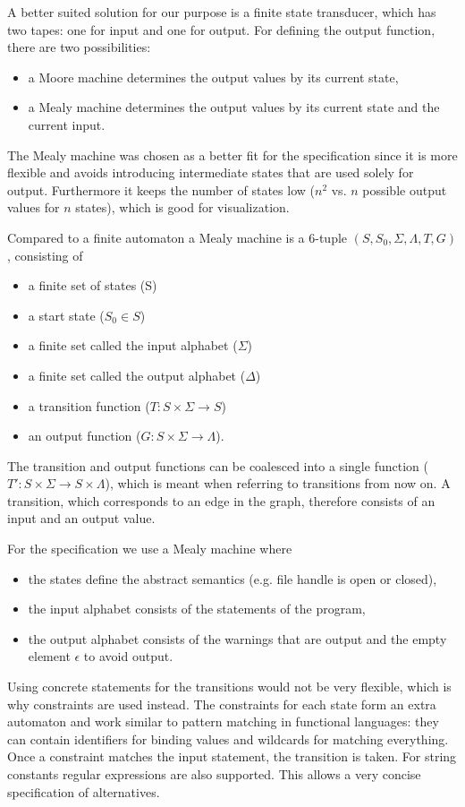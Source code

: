 A better suited solution for our purpose is a finite state transducer, which has two tapes: one for input and one for output. For defining the output function, there are two possibilities:
\begin{itemize}
\item a Moore machine determines the output values by its current state,
\item a Mealy machine determines the output values by its current state and the current input.
\end{itemize}
The Mealy machine was chosen as a better fit for the specification since it is more flexible and avoids introducing intermediate states that are used solely for output. Furthermore it keeps the number of states low ($n^2$ vs. $n$ possible output values for $n$ states), which is good for visualization.

Compared to a finite automaton a Mealy machine is a 6-tuple $(S, S_0, \Sigma, \Lambda, T, G)$, consisting of
\begin{itemize}
\item a finite set of states (S)
\item a start state ($S_0 \in S$)
\item a finite set called the input alphabet ($\Sigma$)
\item a finite set called the output alphabet ($\Delta$)
\item a transition function ($T : S \times \Sigma \rightarrow S$)
\item an output function ($G : S \times \Sigma \rightarrow \Lambda$).
\end{itemize}
The transition and output functions can be coalesced into a single function ($T' : S \times \Sigma \rightarrow S \times \Lambda$), which is meant when referring to transitions from now on.
A transition, which corresponds to an edge in the graph, therefore consists of an input and an output value.

For the specification we use a Mealy machine where
\begin{itemize}
\item the states define the abstract semantics (e.g. file handle is open or closed),
\item the input alphabet consists of the statements of the program,
\item the output alphabet consists of the warnings that are output and the empty element $\epsilon$ to avoid output.
\end{itemize}
Using concrete statements for the transitions would not be very flexible, which is why constraints are used instead. The constraints for each state form an extra automaton and work similar to pattern matching in functional languages: they can contain identifiers for binding values and wildcards for matching everything. Once a constraint matches the input statement, the transition is taken. For string constants regular expressions are also supported.
This allows a very concise specification of alternatives.


